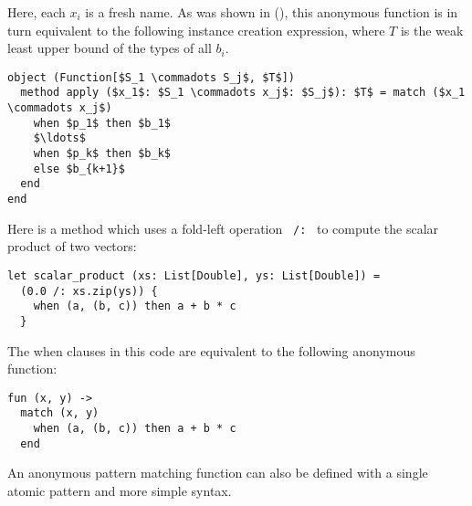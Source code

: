 Here, each $x_i$ is a fresh name. As was shown in (), this anonymous function is in turn equivalent to the following instance creation expression, where $T$ is the weak least upper bound of the types of all $b_i$. 

\begin{lstlisting}
object (Function[$S_1 \commadots S_j$, $T$])
  method apply ($x_1$: $S_1 \commadots x_j$: $S_j$): $T$ = match ($x_1 \commadots x_j$)
    when $p_1$ then $b_1$
    $\ldots$
    when $p_k$ then $b_k$
    else $b_{k+1}$
  end
end
\end{lstlisting}

\example Here is a method which uses a fold-left operation ~\lstinline!/:!~ to compute the scalar product of two vectors:
\begin{lstlisting}
let scalar_product (xs: List[Double], ys: List[Double]) = 
  (0.0 /: xs.zip(ys)) {
    when (a, (b, c)) then a + b * c
  }
\end{lstlisting}
The when clauses in this code are equivalent to the following anonymous function:
\begin{lstlisting}
fun (x, y) -> 
  match (x, y)
    when (a, (b, c)) then a + b * c
  end
\end{lstlisting}

An anonymous pattern matching function can also be defined with a single atomic pattern and more simple syntax. 










